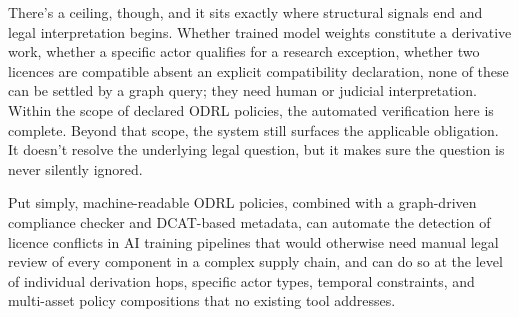 \documentclass[12pt,a4paper]{article}
\begin{document}
There's a ceiling, though, and it sits exactly where structural signals end and legal interpretation begins. Whether trained model weights constitute a derivative work, whether a specific actor qualifies for a research exception, whether two licences are compatible absent an explicit compatibility declaration, none of these can be settled by a graph query; they need human or judicial interpretation. Within the scope of declared ODRL policies, the automated verification here is complete. Beyond that scope, the system still surfaces the applicable obligation. It doesn't resolve the underlying legal question, but it makes sure the question is never silently ignored.

Put simply, machine-readable ODRL policies, combined with a graph-driven compliance checker and DCAT-based metadata, can automate the detection of licence conflicts in AI training pipelines that would otherwise need manual legal review of every component in a complex supply chain, and can do so at the level of individual derivation hops, specific actor types, temporal constraints, and multi-asset policy compositions that no existing tool addresses.



\end{document}
